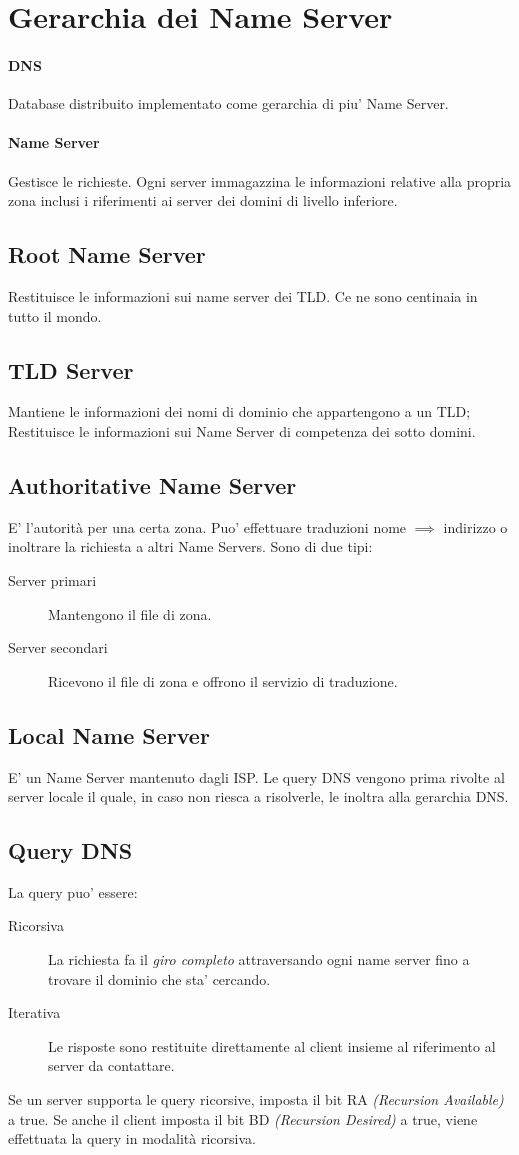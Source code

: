 \section{Gerarchia dei Name Server}
\paragraph{DNS} Database distribuito implementato come gerarchia di piu' Name Server.
\paragraph{Name Server} Gestisce le richieste.
Ogni server immagazzina le informazioni relative alla propria zona inclusi i riferimenti ai server dei domini di livello inferiore.
\subsection{Root Name Server}
Restituisce le informazioni sui name server dei TLD. Ce ne sono centinaia in tutto il mondo.
\subsection{TLD Server}
Mantiene le informazioni dei nomi di dominio che appartengono a un TLD; Restituisce le informazioni sui Name Server di competenza dei sotto domini.
\subsection{Authoritative Name Server}
E' l'autorità per una certa zona. Puo' effettuare traduzioni nome $\implies$ indirizzo o inoltrare la richiesta a altri Name Servers.
Sono di due tipi:
\begin{description}
    \item[Server primari] Mantengono il file di zona.
    \item[Server secondari] Ricevono il file di zona e offrono il servizio di traduzione. 
\end{description}
\subsection{Local Name Server}
E' un Name Server mantenuto dagli ISP.
Le query DNS vengono prima rivolte al server locale il quale, in caso non riesca a risolverle, le inoltra alla gerarchia DNS.
\subsection{Query DNS}
La query puo' essere:
\begin{description}
    \item[Ricorsiva] La richiesta fa il \textit{giro completo} attraversando ogni name server fino a trovare il dominio che sta' cercando.
    \item[Iterativa] Le risposte sono restituite direttamente al client insieme al riferimento al server da contattare.
\end{description}
Se un server supporta le query ricorsive, imposta il bit RA \textit{(Recursion Available)} a true.
Se anche il client imposta il bit BD \textit{(Recursion Desired)} a true, viene effettuata la query in modalità ricorsiva.
